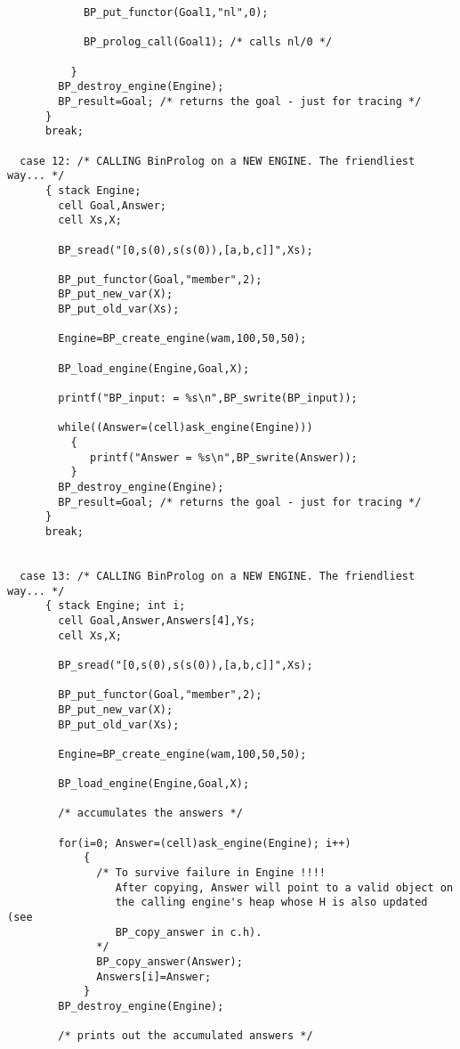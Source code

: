 \documentclass{article}
\begin{document}
{\begin{verbatim}
            BP_put_functor(Goal1,"nl",0);

            BP_prolog_call(Goal1); /* calls nl/0 */

          }
        BP_destroy_engine(Engine);
        BP_result=Goal; /* returns the goal - just for tracing */
      }
      break;

  case 12: /* CALLING BinProlog on a NEW ENGINE. The friendliest way... */
      { stack Engine;
        cell Goal,Answer;
        cell Xs,X;
 
        BP_sread("[0,s(0),s(s(0)),[a,b,c]]",Xs);
         
        BP_put_functor(Goal,"member",2);
        BP_put_new_var(X);        
        BP_put_old_var(Xs);

        Engine=BP_create_engine(wam,100,50,50);

        BP_load_engine(Engine,Goal,X);

        printf("BP_input: = %s\n",BP_swrite(BP_input));  

        while((Answer=(cell)ask_engine(Engine)))
          { 
             printf("Answer = %s\n",BP_swrite(Answer));
          }
        BP_destroy_engine(Engine);
        BP_result=Goal; /* returns the goal - just for tracing */
      }
      break;


  case 13: /* CALLING BinProlog on a NEW ENGINE. The friendliest way... */
      { stack Engine; int i;
        cell Goal,Answer,Answers[4],Ys;
        cell Xs,X;
 
        BP_sread("[0,s(0),s(s(0)),[a,b,c]]",Xs);
         
        BP_put_functor(Goal,"member",2);
        BP_put_new_var(X);        
        BP_put_old_var(Xs);

        Engine=BP_create_engine(wam,100,50,50);

        BP_load_engine(Engine,Goal,X);

        /* accumulates the answers */

        for(i=0; Answer=(cell)ask_engine(Engine); i++)
            { 
              /* To survive failure in Engine !!!! 
                 After copying, Answer will point to a valid object on 
                 the calling engine's heap whose H is also updated (see
                 BP_copy_answer in c.h). 
              */
              BP_copy_answer(Answer);
              Answers[i]=Answer; 
            }
        BP_destroy_engine(Engine);

        /* prints out the accumulated answers */


\end{verbatim}}
\end{document}
